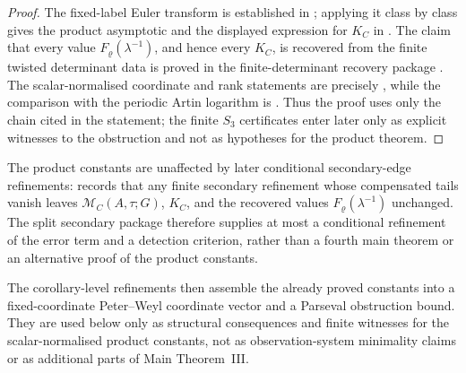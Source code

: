 \documentclass[11pt,a4paper]{amsart}
\theoremstyle{plain}
\theoremstyle{definition}
\theoremstyle{remark}
\begin{document}
\begin{proof}
  The fixed-label Euler transform is established in
  ; applying it class by class gives the
  product asymptotic and the displayed expression for \(K_C\) in
  .  The claim that every value
  \(F_\varrho(\lambda^{-1})\), and hence every \(K_C\), is recovered from the
  finite twisted determinant data is proved in the finite-determinant recovery
  package
  .
  The scalar-normalised coordinate and rank statements are precisely
  , while the comparison
  with the periodic Artin logarithm is
  .
  Thus the proof uses only the chain cited in the statement; the finite
  \(S_3\) certificates enter later only as explicit witnesses to the
  obstruction and not as hypotheses for the product theorem.
\end{proof}

The product constants are unaffected by later conditional secondary-edge
refinements:  records that any
finite secondary refinement whose compensated tails vanish leaves
\(\mathcal M_C(A,\tau;G)\), \(K_C\), and the recovered values
\(F_\varrho(\lambda^{-1})\) unchanged.  The split secondary package therefore
supplies at most a conditional refinement of the error term and a detection
criterion, rather than a fourth main theorem or an alternative proof of the
product constants.

The corollary-level refinements
then assemble the already proved constants into a fixed-coordinate
Peter--Weyl coordinate vector and a Parseval obstruction bound.  They are used below
only as structural consequences and finite witnesses for the
scalar-normalised product constants, not as observation-system minimality
claims or as additional parts of Main Theorem~III.
\end{document}
